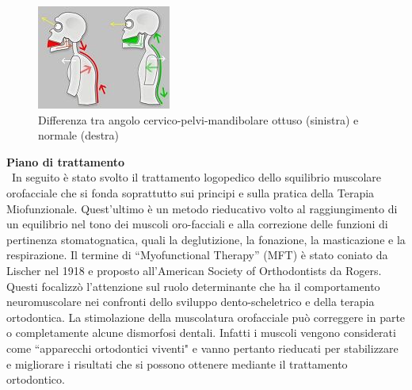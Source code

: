 \begin{figure}[h!]
	\centering
	\includegraphics[scale=0.9]{source/immagini/angolo_cervico-pelvi-mandibolare.jpg}
	\caption[Semantic Web stack]{Differenza tra angolo cervico-pelvi-mandibolare ottuso (sinistra) e normale (destra)}
	\label{fig:issuexample}
\end{figure}

\textbf{Piano di trattamento}
\\\
In seguito è stato svolto il trattamento logopedico dello squilibrio muscolare orofacciale che si fonda soprattutto sui principi e sulla pratica della Terapia Miofunzionale. Quest’ultimo è un metodo rieducativo volto al raggiungimento di un equilibrio nel tono dei muscoli oro-facciali e alla correzione delle funzioni di pertinenza stomatognatica, quali la deglutizione, la fonazione, la masticazione e la respirazione. Il termine di “Myofunctional Therapy” (MFT) è stato coniato da Lischer nel 1918 e proposto all'American Society of Orthodontists da Rogers. Questi focalizzò l'attenzione sul ruolo determinante che ha il comportamento neuromuscolare nei confronti dello sviluppo dento-scheletrico e della terapia ortodontica. La stimolazione della muscolatura orofacciale può correggere in parte o completamente alcune dismorfosi dentali. Infatti i muscoli vengono considerati come “apparecchi ortodontici viventi" e vanno pertanto rieducati per stabilizzare e migliorare i risultati che si possono ottenere mediante il trattamento ortodontico.

